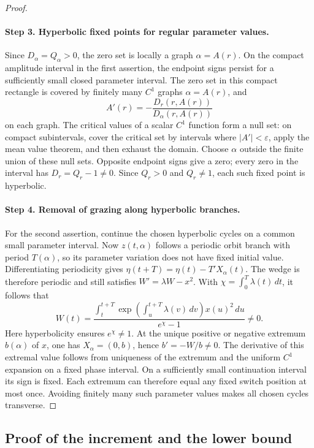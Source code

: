 \documentclass[11pt]{article}
\theoremstyle{remark}
\begin{document}
\begin{proof}
\paragraph{Step 3. Hyperbolic fixed points for regular parameter values.}
Since \(D_\alpha=Q_\alpha>0\), the zero set is locally a graph
\(\alpha=A(r)\).  On the compact amplitude interval in
the first assertion, the endpoint signs persist for a sufficiently small
closed parameter interval.  The zero set in this compact rectangle is
covered by finitely many \(C^1\) graphs \(\alpha=A(r)\), and
\[
 A'(r)=-\frac{D_r(r,A(r))}{D_\alpha(r,A(r))}
\]
on each graph.  The critical values of a scalar \(C^1\) function form a
null set: on compact subintervals, cover the critical set by intervals
where \(|A'|<\varepsilon\), apply the mean value theorem, and then
exhaust the domain.  Choose \(\alpha\) outside the finite union of these
null sets.  Opposite endpoint signs give a zero; every zero in the
interval has \(D_r=Q_r-1\ne0\).  Since \(Q_r>0\) and \(Q_r\ne1\),
each such fixed point is hyperbolic.

\paragraph{Step 4. Removal of grazing along hyperbolic branches.}
For the second assertion, continue the chosen hyperbolic cycles on a
common small parameter interval.  Now \(z(t,\alpha)\) follows a periodic
orbit branch with period \(T(\alpha)\), so its parameter variation does
not have fixed initial value.  Differentiating periodicity gives
\(\eta(t+T)=\eta(t)-T'X_\alpha(t)\).  The wedge is therefore periodic
and still satisfies \(W'=\lambda W-x^2\).  With
\(\chi=\int_0^T\lambda(t)\,dt\), it follows that
\[
 W(t)=\frac{\displaystyle\int_t^{t+T}
       \exp\!\left(\int_u^{t+T}\lambda(v)\,dv\right)x(u)^2\,du}
                    {e^\chi-1}\ne0.
\]
Here hyperbolicity ensures \(e^\chi\ne1\).  At the unique positive or
negative extremum \(b(\alpha)\) of \(x\), one has
\(X_\alpha=(0,b)\), hence \(b'=-W/b\ne0\).  The derivative of this
extremal value follows from uniqueness of the extremum and the uniform
\(C^1\) expansion on a fixed phase interval.  On a sufficiently small
continuation interval its sign is fixed.  Each extremum can therefore
equal any fixed switch position at most once.  Avoiding finitely many
such parameter values makes all chosen cycles transverse.
\end{proof}

\subsection{Proof of the increment and the lower bound}
\end{document}
